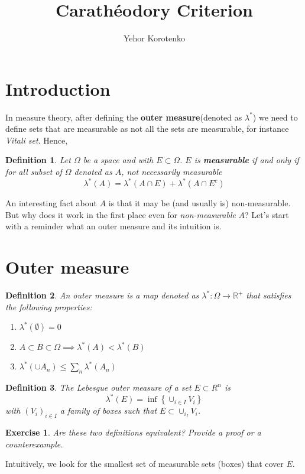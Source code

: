 \documentclass[a4paper]{article}
\author{Yehor Korotenko}
\title{Carathéodory Criterion}
\newcommand{\R}{\mathbb{R}}
\newtheorem{definition}{Definition}[section]
\newtheorem{exercise}{Exercise}[section]
\begin{document}
\section{Introduction}
   In measure theory, after defining the \textbf{outer measure}(denoted as $\lambda^*$) we need to
   define sets that are measurable as not all the sets are measurable, for
   instance \textit{Vitali set}. Hence,
\begin{definition}
Let $\Omega$ be a space and with $E \subset \Omega$. $E$ is  \textbf{measurable} if and only if for all subset of $\Omega$ denoted as $A$, not necessarily measurable
\[
\lambda^*(A) = \lambda^*(A \cap E) + \lambda^*(A \cap E^c)
\] 
\end{definition}
An interesting fact about $A$ is that it may be (and usually is)
non-measurable. But why does it work in the first place even for
\textit{non-measurable} $A$? Let's start with a reminder what an outer measure and its intuition is.

\section{Outer measure}%
\label{sec:Outer measure}
\begin{definition}
    An outer measure is a map denoted as $\lambda^*: \Omega \to \R^+$ that satisfies the following properties:
    \begin{enumerate}
        \item $\lambda^*(\emptyset) = 0$
        \item $A \subset B \subset \Omega \implies \lambda^*(A) < \lambda^*(B)$ 
        \item $\lambda^*(\cup A_n) \le \sum_n \lambda^*(A_n)$
    \end{enumerate}
\end{definition}
\begin{definition}\label{defn:lebesgue-outer-measure}
    The Lebesgue outer measure of a set $E \subset R^n$ is 
    \[
        \lambda^*(E) = \inf \left\{ \cup_{i \in I} V_i \right\}
    \] 
    with $(V_i)_{i \in I}$ a family of boxes such that $E \subset \cup_{i_I} V_i$.
\end{definition}
\begin{exercise}
   Are these two definitions equivalent? Provide a proof or a counterexample.
\end{exercise}

Intuitively, we look for the smallest set of measurable sets (boxes) that cover
$E$.  
\end{document}
